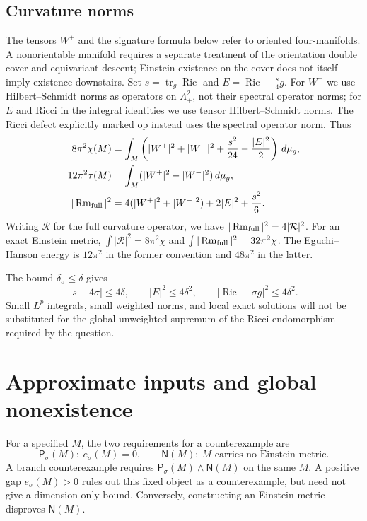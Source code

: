\documentclass[a4paper,11pt]{article}
\numberwithin{equation}{section}
\theoremstyle{definition}
\newcommand{\Ric}{\operatorname{Ric}}
\newcommand{\Rm}{\operatorname{Rm}}
\newcommand{\tr}{\operatorname{tr}}
\newcommand{\op}{\mathrm{op}}
\newcommand{\dd}{\,d\mu_g}
\begin{document}
\subsection{Curvature norms}
The tensors $W^\pm$ and the signature formula below refer to oriented four-manifolds. A nonorientable manifold requires a separate treatment of the orientation double cover and equivariant descent; Einstein existence on the cover does not itself imply existence downstairs. Set $s=\tr_g\Ric$ and $E=\Ric-\frac{s}{4}g$. For $W^\pm$ we use Hilbert--Schmidt norms as operators on $\Lambda^2_\pm$, not their spectral operator norms; for $E$ and Ricci in the integral identities we use tensor Hilbert--Schmidt norms. The Ricci defect explicitly marked $\op$ instead uses the spectral operator norm. Thus
\begin{align}
8\pi^2\chi(M)&=\int_M\left(|W^+|^2+|W^-|^2+\frac{s^2}{24}-\frac{|E|^2}{2}\right)\dd,\label{eq:CGB}\\
12\pi^2\tau(M)&=\int_M(|W^+|^2-|W^-|^2)\dd,\label{eq:signature}\\
|\Rm_{\rm full}|^2&=4(|W^+|^2+|W^-|^2)+2|E|^2+\frac{s^2}{6}.
\end{align}
Writing $\mathcal R$ for the full curvature operator, we have $|\Rm_{\rm full}|^2=4|\mathcal R|^2$. For an exact Einstein metric, $\int|\mathcal R|^2=8\pi^2\chi$ and $\int|\Rm_{\rm full}|^2=32\pi^2\chi$. The Eguchi--Hanson energy is $12\pi^2$ in the former convention and $48\pi^2$ in the latter.

The bound $\delta_\sigma\le\delta$ gives
\begin{equation}
 |s-4\sigma|\le4\delta,\qquad |E|^2\le4\delta^2,\qquad
 |\Ric-\sigma g|^2\le4\delta^2.
\end{equation}
Small $L^p$ integrals, small weighted norms, and local exact solutions will not be substituted for the global unweighted supremum of the Ricci endomorphism required by the question.

\section{Approximate inputs and global nonexistence}\label{sec:smooth-object-judgement}
For a specified $M$, the two requirements for a counterexample are
\[
\mathsf P_\sigma(M):\ e_\sigma(M)=0,
\qquad
\mathsf N(M):\ M\text{ carries no Einstein metric}.
\]
A branch counterexample requires $\mathsf P_\sigma(M)\land\mathsf N(M)$ on the same $M$.
A positive gap $e_\sigma(M)>0$ rules out this fixed object as a counterexample, but need not give a dimension-only bound.
Conversely, constructing an Einstein metric disproves $\mathsf N(M)$.
\end{document}
